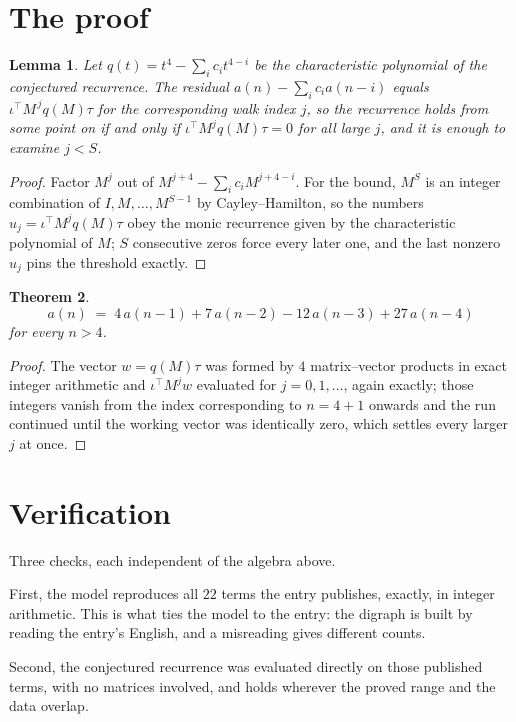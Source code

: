 \documentclass[11pt,a4paper]{article}
\theoremstyle{plain}
\newtheorem{theorem}{Theorem}
\newtheorem{lemma}[theorem]{Lemma}
\theoremstyle{definition}
\begin{document}
\section{The proof}

\begin{lemma}\label{lem:crit}
Let $q(t)=t^{4}-\sum_i c_it^{4-i}$ be the characteristic polynomial of the
conjectured recurrence. The residual $a(n)-\sum_ic_ia(n-i)$ equals
$\iota^{\!\top}M^{\,j}q(M)\tau$ for the corresponding walk index $j$, so the recurrence
holds from some point on if and only if $\iota^{\!\top}M^{j}q(M)\tau=0$ for all large $j$,
and it is enough to examine $j<S$.
\end{lemma}

\begin{proof}
Factor $M^{j}$ out of $M^{j+4}-\sum_ic_iM^{j+4-i}$. For the bound, $M^{S}$
is an integer combination of $I,M,\dots,M^{S-1}$ by Cayley--Hamilton, so the numbers
$u_j=\iota^{\!\top}M^{j}q(M)\tau$ obey the monic recurrence given by the characteristic
polynomial of $M$; $S$ consecutive zeros force every later one, and the last nonzero $u_j$
pins the threshold exactly.
\end{proof}

\begin{theorem}
\[
a(n)\;=\;4\,a(n-1) + 7\,a(n-2) - 12\,a(n-3) + 27\,a(n-4)
\]
for every $n>4$.
\end{theorem}

\begin{proof}
The vector $w=q(M)\tau$ was formed by $4$ matrix--vector products in exact integer
arithmetic and $\iota^{\!\top}M^{j}w$ evaluated for $j=0,1,\dots$, again exactly; those
integers vanish from the index corresponding to $n=4+1$ onwards and the run continued
until the working vector was identically zero, which settles every larger $j$ at once.
\end{proof}

\section{Verification}

Three checks, each independent of the algebra above.

First, the model reproduces all $22$ terms the entry publishes, exactly, in integer
arithmetic. This is what ties the model to the entry: the digraph is built by reading the
entry's English, and a misreading gives different counts.

Second, the conjectured recurrence was evaluated directly on those published terms, with no
matrices involved, and holds wherever the proved range and the data overlap.
\end{document}
